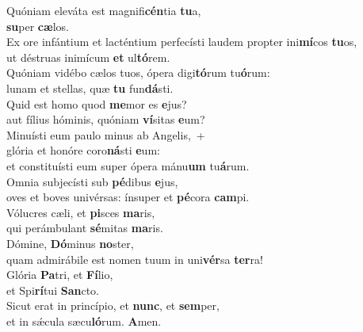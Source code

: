 \evenverse Quóniam eleváta est magnifi\textbf{cén}tia \textbf{tu}a,~\*\\
\evenverse \textbf{su}per \textbf{cæ}los.\\
\oddverse Ex ore infántium et lacténtium perfecísti laudem propter ini\textbf{mí}cos \textbf{tu}os,~\*\\
\oddverse ut déstruas inimícum \textbf{et} ul\textbf{tó}rem.\\
\evenverse Quóniam vidébo cælos tuos, ópera digi\textbf{tó}rum tu\textbf{ó}rum:~\*\\
\evenverse lunam et stellas, quæ \textbf{tu} fun\textbf{dá}sti.\\
\oddverse Quid est homo quod \textbf{me}mor es \textbf{e}jus?~\*\\
\oddverse aut fílius hóminis, quóniam \textbf{ví}sitas \textbf{e}um?\\
\evenverse Minuísti eum paulo minus ab Angelis,~+\\
\evenverse  glória et honóre coro\textbf{ná}sti \textbf{e}um:~\*\\
\evenverse et constituísti eum super ópera mánu\textbf{um} tu\textbf{á}rum.\\
\oddverse Omnia subjecísti sub \textbf{pé}dibus \textbf{e}jus,~\*\\
\oddverse oves et boves univérsas: ínsuper et \textbf{pé}cora \textbf{cam}pi.\\
\evenverse Vólucres cæli, et \textbf{pi}sces \textbf{ma}ris,~\*\\
\evenverse qui perámbulant \textbf{sé}mitas \textbf{ma}ris.\\
\oddverse Dómine, \textbf{Dó}minus \textbf{no}ster,~\*\\
\oddverse quam admirábile est nomen tuum in uni\textbf{vér}sa \textbf{ter}ra!\\
\evenverse Glória \textbf{Pa}tri, et \textbf{Fí}lio,~\*\\
\evenverse et Spi\textbf{rí}tui \textbf{San}cto.\\
\oddverse Sicut erat in princípio, et \textbf{nunc}, et \textbf{sem}per,~\*\\
\oddverse et in sǽcula sæcu\textbf{ló}rum. \textbf{A}men.\\
